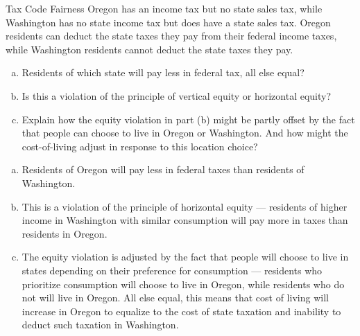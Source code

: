 \documentclass[10pt]{extarticle}
\begin{document}
  \begin{problem}{Tax Code Fairness}
    Oregon has an income tax but no state sales tax, while Washington has no state income tax but does have a state sales tax. Oregon residents can deduct the state taxes they pay from their federal income taxes, while Washington residents cannot deduct the state taxes they pay.
    \begin{enumerate}[(a)]
      \item Residents of which state will pay less in federal tax, all else equal?
      \item Is this a violation of the principle of vertical equity or horizontal equity?
      \item Explain how the equity violation in part (b) might be partly offset by the fact that people can choose to live in Oregon or Washington. And how might the cost-of-living adjust in response to this location choice?
    \end{enumerate}
    \tcblower
    \begin{enumerate}[(a)]
      \item Residents of Oregon will pay less in federal taxes than residents of Washington.
      \item This is a violation of the principle of horizontal equity — residents of higher income in Washington with similar consumption will pay more in taxes than residents in Oregon.
      \item The equity violation is adjusted by the fact that people will choose to live in states depending on their preference for consumption — residents who prioritize consumption will choose to live in Oregon, while residents who do not will live in Oregon. All else equal, this means that cost of living will increase in Oregon to equalize to the cost of state taxation and inability to deduct such taxation in Washington.
    \end{enumerate}
  \end{problem}
\end{document}
